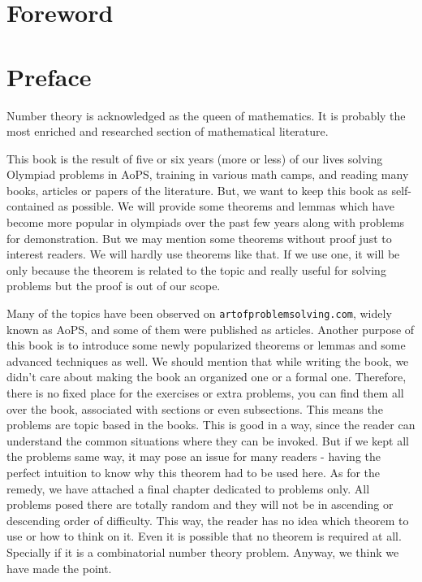 \documentclass[main.tex]{subfile}
\begin{document}
	
	
	\section*{Foreword}
	\newpage
	
	\section*{Preface}
	
	Number theory is acknowledged as the queen of mathematics. It is probably the most enriched and researched section of mathematical literature.  
	
	This book is the result of five or six years (more or less) of our lives solving Olympiad problems in AoPS, training in various math camps, and reading many books, articles or papers of the literature. But, we want to keep this book as self-contained as possible. We will provide some theorems and lemmas which have become more popular in olympiads over the past few years along with problems for demonstration. But we may mention some theorems without proof just to interest readers. We will hardly use theorems like that. If we use one, it will be only because the theorem is related to the topic and really useful for solving problems but the proof is out of our scope.
	
	Many of the topics have been observed on \texttt{artofproblemsolving.com}, widely known as {AoPS}, and some of them were published 
	as articles. Another purpose of this book is to introduce some newly popularized theorems or lemmas and some advanced techniques as well. We should mention that while writing the book, we didn't care about making the book an organized one or a formal one. Therefore, there is no fixed place for the exercises or extra problems, you can find them all over the book, associated with sections or even subsections. This means the problems are topic based in the books. This is good in a way, since the reader can understand the common situations where they can be invoked. But if we kept all the problems same way, it may pose an issue for many readers - having the perfect intuition to know why this theorem had to be used here. As for the remedy, we have attached a final chapter dedicated to problems only. All problems posed there are totally random and they will not be in ascending or descending order of difficulty. This way, the reader has no idea which theorem to use or how to think on it. Even it is possible that no theorem is required at all. Specially if it is a combinatorial number theory problem. Anyway, we think we have made the point.
	
\end{document}
